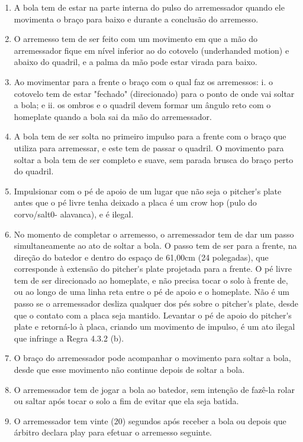 \begin{description}
\begin{enumerate}[label=(\alph*)]
		\item  A bola tem de estar na parte interna do pulso do arremessador quando ele movimenta o braço para baixo e durante a conclusão do arremesso.
		\item  O arremesso tem de ser feito com um movimento em que a mão do arremessador fique em nível inferior ao do cotovelo (\gls{underhanded motion}) e
		abaixo do quadril, e a palma da mão pode estar virada para baixo.
		\item  Ao movimentar para a frente o braço com o qual faz os arremessos:
		i. o cotovelo tem de estar "fechado" (direcionado) para o ponto de onde vai soltar a bola; e
		ii. os ombros e o quadril devem formar um ângulo reto com o \gls{homeplate} quando a bola sai da mão do arremessador.
		\item  A bola tem de ser solta no primeiro impulso para a frente com o braço que utiliza para arremessar, e este tem de passar o quadril. O movimento para soltar a bola tem de ser completo e suave, sem parada brusca do braço perto do quadril.
		\item   Impulsionar com o pé de apoio de um lugar que não seja o \gls{pitcher's plate} antes que o pé livre tenha deixado a placa é um \gls{crow hop} (pulo do corvo/salt0- alavanca), e é ilegal.
		\item   No momento de completar o arremesso, o arremessador tem de dar um passo simultaneamente ao ato de soltar a bola. O passo tem de ser para a frente, na  direção do batedor e dentro do espaço de 61,00cm (24 polegadas), que corresponde à extensão do \gls{pitcher's plate} projetada para a frente. O pé livre tem de ser direcionado ao \gls{homeplate}, e não precisa tocar o solo à frente de, ou ao longo de uma linha reta entre o pé de apoio e o \gls{homeplate}. Não é um passo se o arremessador desliza qualquer dos pés sobre o \gls{pitcher's plate}, desde que o contato com a placa seja mantido. Levantar o pé de apoio do \gls{pitcher's plate} e retorná-lo à placa, criando um movimento de impulso, é um ato ilegal que infringe a Regra 4.3.2 (b).
		\item  O braço do arremessador pode acompanhar o movimento para soltar a bola, desde que esse movimento não continue depois de soltar a bola.
		\item   O arremessador tem de jogar a bola ao batedor, sem intenção de fazê-la rolar ou saltar após tocar o solo a fim de evitar que ela seja batida.
		\item   O arremessador tem vinte (20) segundos após receber a bola ou depois que árbitro declara \gls{play} para efetuar o arremesso seguinte.
	\end{enumerate}
\end{description}


